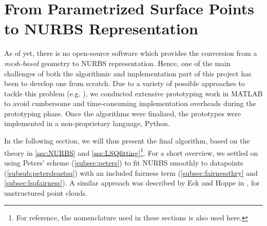 \section{From Parametrized Surface Points to NURBS Representation}
As of yet, there is no open-source software which provides the conversion from a \textit{mesh-based} geometry to NURBS representation. Hence, one of the main challenges of both the algorithmic and implementation part of this project has been to develop one from scratch. Due to a variety of possible approaches to tackle this problem (e.g. \cite{eck1996automatic, becker2011advanced}), we conducted extensive prototyping work in MATLAB \cite{MATLAB} to avoid cumbersome and time-consuming implementation overheads during the prototyping phase. Once the algorithms were finalized, the prototypes were implemented in a non-proprietary language, Python. 

In the following section, we will thus present the final algorithm, based on the theory in \autoref{sec:NURBS} and \autoref{sec:LSQfitting}\footnote{For reference, the nomenclature used in these sections is also used here.}. For a short overview, we settled on using Peters' scheme (\autoref{subsec:peters}) to fit NURBS smoothly to datapoints (\autoref{subsub:petersleastsq}) with an included fairness term (\autoref{subsec:fairnessthry} and \autoref{subsec:lsqfairness}). A similar approach was described by Eck and Hoppe in \cite{eck1996automatic}, for unstructured point clouds.

